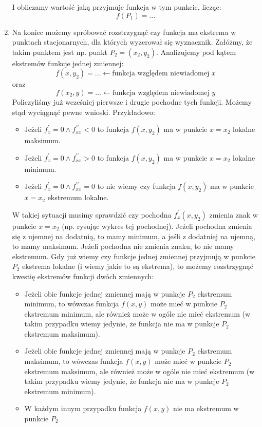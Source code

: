 \begin{enumerate}[itemsep=0pt,partopsep=0pt, parsep=0pt]
    I obliczamy wartość jaką przyjmuje funkcja w tym punkcie, licząc:
    \[
        f(P_1)= \dots
    \]
    \item Na koniec możemy spróbować rozstrzygnąć czy funkcja ma ekstrema w punktach stacjonarnych,
    dla których wyzerował się wyznacznik.
    Załóżmy, że takim punktem jest np. punkt $P_2=(x_2,y_2)$.
    Analizujemy pod kątem ekstremów funkcje jednej zmiennej:
    \[
        f(x,y_2)= \dots \leftarrow \text{funkcja względem niewiadomej $x$}
    \]
    oraz
    \[
        f(x_2,y)= \dots \leftarrow \text{funkcja względem niewiadomej $y$}
    \]
    Policzyliśmy już wcześniej pierwsze i drugie pochodne tych funkcji.
    Możemy stąd wyciągnąć pewne wnioski. Przykładowo:
    \begin{itemize}[itemsep=0pt,partopsep=0pt, parsep=0pt]
        \item Jeżeli $f^{\prime}_x=0 \land f^{\prime\prime}_{xx}<0$ to funkcja $f(x,y_2)$ ma w punkcie $x=x_2$ lokalne maksimum.
        \item Jeżeli $f^{\prime}_x=0 \land f^{\prime\prime}_{xx}>0$ to funkcja $f(x,y_2)$ ma w punkcie $x=x_2$ lokalne minimum.
        \item Jeżeli $f^{\prime}_x=0 \land f^{\prime\prime}_{xx}=0$ to nie wiemy czy funkcja $f(x,y_2)$
        ma w punkcie $x=x_2$ ekstremum lokalne.
    \end{itemize}
    W takiej sytuacji musimy sprawdzić czy pochodna $f^{\prime}_x(x,y_2)$ zmienia znak w punkcie $x=x_2$
    (np. rysując wykres tej pochodnej).
    Jeżeli pochodna zmienia się z ujemnej na dodatnią, to mamy minimum, a jeśli z dodatniej na ujemną, to mamy maksimum.
    Jeżeli pochodna nie zmienia znaku, to nie mamy ekstremum.
    Gdy już wiemy czy funkcje jednej zmiennej przyjmują w punkcie $P_2$ ekstrema lokalne (i wiemy jakie to są ekstrema),
    to możemy rozstrzygnąć kwestię ekstremów funkcji dwóch zmiennych:
    \begin{itemize}[itemsep=0pt,partopsep=0pt, parsep=0pt]
        \item Jeżeli obie funkcje jednej zmiennej mają w punkcje $P_2$ ekstremum minimum, to wówczas funkcja $f(x,y)$
        może mieć w punkcie $P_2$ ekstremum minimum, ale również może w ogóle nie mieć ekstremum
        (w takim przypadku wiemy jedynie, że funkcja nie ma w punkcje $P_2$ ekstremum maksimum).
        \item Jeżeli obie funkcje jednej zmiennej mają w punkcje $P_2$ ekstremum maksimum, to wówczas funkcja $f(x,y)$
        może mieć w punkcie $P_2$ ekstremum maksimum, ale również może w ogóle nie mieć ekstremum
        (w takim przypadku wiemy jedynie, że funkcja nie ma w punkcje $P_2$ ekstremum minimum).
        \item W każdym innym przypadku funkcja $f(x,y)$ nie ma ekstremum w punkcie $P_2$
    \end{itemize}
\end{enumerate}
